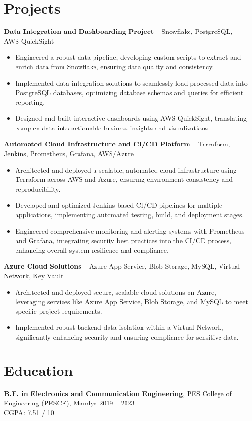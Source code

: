 \documentclass[a4paper,9pt]{article}
\begin{document}
\section*{Projects}
	\textbf{Data Integration and Dashboarding Project} – Snowflake, PostgreSQL, AWS QuickSight
\begin{itemize}[leftmargin=0.25in, label=\textbullet]
    \item Engineered a robust data pipeline, developing custom scripts to extract and enrich data from Snowflake, ensuring data quality and consistency.
    \item Implemented data integration solutions to seamlessly load processed data into PostgreSQL databases, optimizing database schemas and queries for efficient reporting.
    \item Designed and built interactive dashboards using AWS QuickSight, translating complex data into actionable business insights and visualizations.
\end{itemize}


	\textbf{Automated Cloud Infrastructure and CI/CD Platform} – Terraform, Jenkins, Prometheus, Grafana, AWS/Azure
\begin{itemize}[leftmargin=0.25in, label=\textbullet]
    \item Architected and deployed a scalable, automated cloud infrastructure using Terraform across AWS and Azure, ensuring environment consistency and reproducibility.
    \item Developed and optimized Jenkins-based CI/CD pipelines for multiple applications, implementing automated testing, build, and deployment stages.
    \item Engineered comprehensive monitoring and alerting systems with Prometheus and Grafana, integrating security best practices into the CI/CD process, enhancing overall system resilience and compliance.
\end{itemize}


\textbf{Azure Cloud Solutions} – Azure App Service, Blob Storage, MySQL, Virtual Network, Key Vault
\begin{itemize}[leftmargin=0.25in, label=\textbullet]
    \item Architected and deployed secure, scalable cloud solutions on Azure, leveraging services like Azure App Service, Blob Storage, and MySQL to meet specific project requirements.
    \item Implemented robust backend data isolation within a Virtual Network, significantly enhancing security and ensuring compliance for sensitive data.
\end{itemize}

\section*{Education}
\textbf{B.E. in Electronics and Communication Engineering}, PES College of Engineering (PESCE), Mandya \hfill 2019 – 2023 \\CGPA: 7.51 / 10
\end{document}
